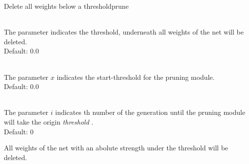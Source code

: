 
\begin{moduledoc}{Delete all weights below a threshold}{prune}
  
\item[\KeyWord{threshold} \optParam{t}]~\\
  The parameter  indicates the threshold, underneath all weights of 
  the net will be deleted.\\
  Default: 0.0

\item[\KeyWord{thresholdStart} \optParam{f}]~\\
  The parameter $x$ indicates the start-threshold for the pruning module.\\
  Default: 0.0

\item[\KeyWord{pruneEndGen} \optParam{i}]~\\
  The parameter $i$ indicates th number of the generation until the 
  pruning module will take the origin {\it threshold}
  .\\
  Default: 0
\end{moduledoc}
  
All weights of the net with an abolute strength under the threshold will be deleted.

\vspace*{0.5cm}


